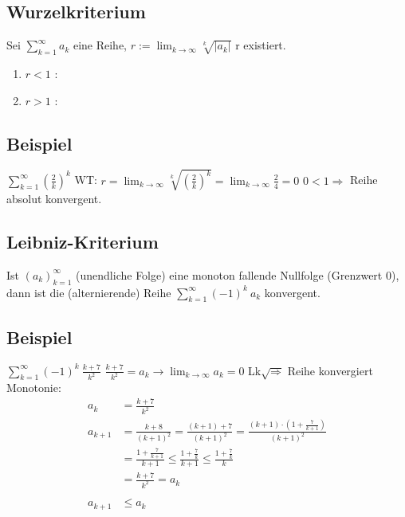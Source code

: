 \documentclass[../mainfile.tex]{subfiles}
\begin{document}
	\subsection{Wurzelkriterium}
	Sei $\sum_{k=1}^\infty a_k$ eine Reihe, $r:=\lim_{k\to\infty} \sqrt[k]{|a_k|}$
	r existiert.
		\begin{enumerate}[label=(\alph*)]
			\item $r < 1$ :
			\item $r > 1$ :
		\end{enumerate}
	\subsection*{Beispiel}
	$\sum_{k=1}^\infty (\frac{2}{k})^k$
	\newline
	\newline
	WT: $r = \lim_{k\to\infty} \sqrt[k]{(\frac{2}{k})^k} = \lim_{k\to\infty} \frac{2}{4} = 0$
	\newline
	$0 < 1 \Longrightarrow$ Reihe absolut konvergent. 
	
	\subsection{Leibniz-Kriterium}
	Ist $(a_k)^\infty_{k=1}$ (unendliche Folge) eine monoton fallende Nullfolge (Grenzwert 0), dann ist die (alternierende) Reihe $\sum_{k=1}^\infty (-1)^k \: a_k$ konvergent.
	\subsection*{Beispiel}
	 $\sum_{k=1}^\infty (-1)^k\:\frac{k+7}{k^2}$
	\newline \newline
	$\frac{k+7}{k^2} = a_k \longrightarrow \lim_{k\to\infty} a_k = 0$ 
	\newline
	Lk$\surd \Longrightarrow$ Reihe konvergiert
	\newline \newline
	Monotonie: 
	\begin{align*}
		a_k & = \frac{k+7}{k^2} \\
		a_{k+1} & = \frac{k+8}{(k+1)^2} = \frac{(k+1)+7}{(k+1)^2} = \frac{(k+1)\cdot(1+\frac{7}{k+1})}{(k+1)^2} \\
		& = \frac{1+\frac{7}{k+1}}{k+1} \leq \frac{1+\frac{7}{k}}{k+1} \leq \frac{1+\frac{7}{k}}{k} \\
		& = \frac{k+7}{k^2} = a_k \\
		\\
		a_{k+1} & \leq a_k
	\end{align*}
	\newline
	
	
\end{document}
